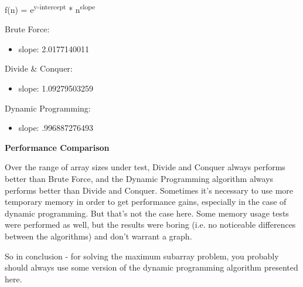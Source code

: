 \documentclass[letterpaper,10pt,titlepage,fleqn]{article}
\begin{document}
f(n) = e\textsuperscript{y-intercept} * n\textsuperscript{slope}

Brute Force:
\begin{itemize}
\item slope: 2.0177140011
\end{itemize}

Divide \& Conquer:
\begin{itemize}
\item slope: 1.09279503259
\end{itemize}

Dynamic Programming:
\begin{itemize}
\item slope: .996887276493
\end{itemize}

\begin{centering}
\textbf{Performance Comparison}
\end{centering}

Over the range of array sizes under test, Divide and Conquer always performs better than Brute Force, and the Dynamic Programming algorithm always performs better than Divide and Conquer. Sometimes it's necessary to use more temporary memory in order to get performance gains, especially in the case of dynamic programming. But that's not the case here. Some memory usage tests were performed as well, but the results were boring (i.e. no noticeable differences between the algorithms) and don't warrant a graph. 

So in conclusion - for solving the maximum subarray problem, you probably should always use some version of the dynamic programming algorithm presented here.
\end{document}
